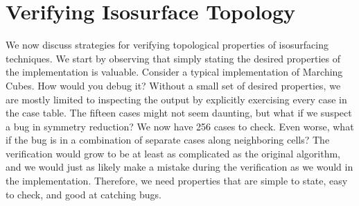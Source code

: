 \section{Verifying Isosurface Topology}
\label{sec:problem}

We now discuss strategies for verifying topological
properties of isosurfacing techniques. 
%
We start by observing that simply stating the desired properties of
the implementation is valuable.
%
Consider a typical implementation of Marching Cubes.
%
How would you debug it?
%
Without a small set of desired properties, we are mostly limited to
inspecting the output by explicitly exercising every case in the case
table. The fifteen cases might not seem daunting, but what if we
suspect a bug in symmetry reduction? We now have 256 cases
to check. Even worse, what if the bug is in a combination of separate
cases along neighboring cells?
%
The verification would grow to be at least as complicated as the
original algorithm, and we would just as likely make a mistake during
the verification as we would in the implementation.
%
Therefore, we need properties that are simple to state, easy to check,
and good at catching bugs.

